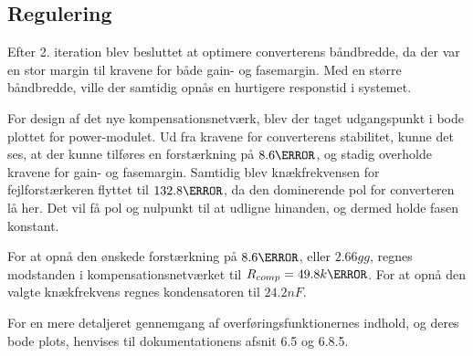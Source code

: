
\subsection{Regulering}
Efter 2. iteration blev besluttet at optimere converterens båndbredde, da der var en stor margin til kravene for både gain- og fasemargin. Med en større båndbredde, ville der samtidig opnås en hurtigere responstid i systemet. 

For design af det nye kompensationsnetværk, blev der taget udgangspunkt i bode plottet for power-modulet. Ud fra kravene for converterens stabilitet, kunne det ses, at der kunne tilføres en forstærkning på $8.6\decibel$, og stadig overholde kravene for gain- og fasemargin. Samtidig blev knækfrekvensen for fejlforstærkeren flyttet til $132.8\hertz$, da den dominerende pol for converteren lå her. Det vil få pol og nulpunkt til at udligne hinanden, og dermed holde fasen konstant. 

For at opnå den ønskede forstærkning på $8.6\decibel$, eller $2.66gg$, regnes modstanden i kompensationsnetværket til $R_{comp} = 49.8k\ohm$. For at opnå den valgte knækfrekvens regnes kondensatoren til $24.2nF$. 

For en mere detaljeret gennemgang af overføringsfunktionernes indhold, og deres bode plots, henvises til dokumentationens afsnit 6.5 og 6.8.5.
